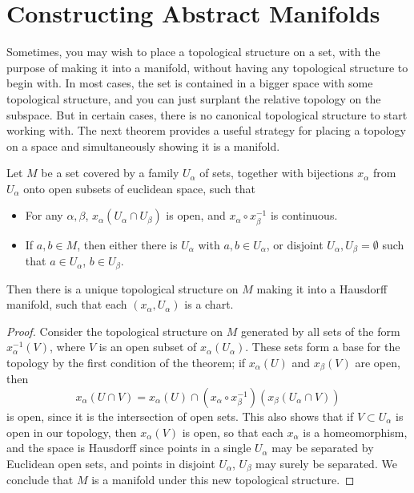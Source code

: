 
\section{Constructing Abstract Manifolds}

Sometimes, you may wish to place a topological structure on a set, with the purpose of making it into a manifold, without having any topological structure to begin with. In most cases, the set is contained in a bigger space with some topological structure, and you can just surplant the relative topology on the subspace. But in certain cases, there is no canonical topological structure to start working with. The next theorem provides a useful strategy for placing a topology on a space and simultaneously showing it is a manifold.

\begin{theorem}
    Let $M$ be a set covered by a family $U_\alpha$ of sets, together with bijections $x_\alpha$ from $U_\alpha$ onto open subsets of euclidean space, such that
    \begin{itemize}
        \item For any $\alpha, \beta$, $x_\alpha(U_\alpha \cap U_\beta)$ is open, and $x_\alpha \circ x_\beta^{-1}$ is continuous.
        \item If $a, b \in M$, then either there is $U_\alpha$ with $a,b \in U_\alpha$, or disjoint $U_\alpha, U_\beta = \emptyset$ such that $a \in U_\alpha$, $b \in U_\beta$.
    \end{itemize}
    Then there is a unique topological structure on $M$ making it into a Hausdorff manifold, such that each $(x_\alpha, U_\alpha)$ is a chart.
\end{theorem}
\begin{proof}
    Consider the topological structure on $M$ generated by all sets of the form $x_\alpha^{-1}(V)$, where $V$ is an open subset of $x_\alpha(U_\alpha)$. These sets form a base for the topology by the first condition of the theorem; if $x_\alpha(U)$ and $x_\beta(V)$ are open, then
    \[ x_\alpha(U \cap V) = x_\alpha(U) \cap (x_\alpha \circ x_\beta^{-1})(x_\beta(U_\alpha \cap V)) \]
    is open, since it is the intersection of open sets. This also shows that if $V \subset U_\alpha$ is open in our topology, then $x_\alpha(V)$ is open, so that each $x_\alpha$ is a homeomorphism, and the space is Hausdorff since points in a single $U_\alpha$ may be separated by Euclidean open sets, and points in disjoint $U_\alpha$, $U_\beta$ may surely be separated. We conclude that $M$ is a manifold under this new topological structure.
\end{proof}

